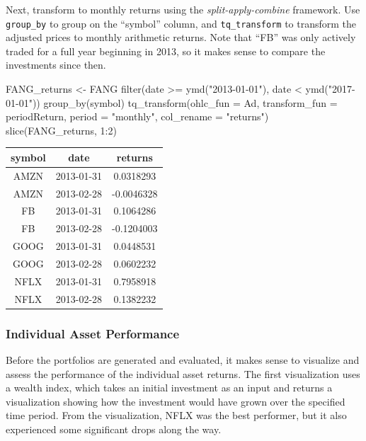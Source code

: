 \hspace{20 mm}

Next, transform to monthly returns using the \emph{split-apply-combine}
framework. Use \texttt{group\_by} to group on the ``symbol'' column, and
\texttt{tq\_transform} to transform the adjusted prices to monthly
arithmetic returns. Note that ``FB'' was only actively traded for a full
year beginning in 2013, so it makes sense to compare the investments
since then.

\begin{Schunk}
\begin{Sinput}
FANG_returns <- FANG %
    filter(date >= ymd("2013-01-01"),
           date <  ymd("2017-01-01")) %
    group_by(symbol) %
    tq_transform(ohlc_fun = Ad,
                 transform_fun = periodReturn,
                 period = "monthly",
                 col_rename = "returns")
slice(FANG_returns, 1:2)
\end{Sinput}
\end{Schunk}

\begin{tabular}{ccc}
\toprule
symbol & date & returns\\
\midrule
AMZN & 2013-01-31 & 0.0318293\\
AMZN & 2013-02-28 & -0.0046328\\
FB & 2013-01-31 & 0.1064286\\
FB & 2013-02-28 & -0.1204003\\
GOOG & 2013-01-31 & 0.0448531\\
\addlinespace
GOOG & 2013-02-28 & 0.0602232\\
NFLX & 2013-01-31 & 0.7958918\\
NFLX & 2013-02-28 & 0.1382232\\
\bottomrule
\end{tabular}

\hspace{20 mm}

\subsubsection{Individual Asset
Performance}\label{individual-asset-performance}

Before the portfolios are generated and evaluated, it makes sense to
visualize and assess the performance of the individual asset returns.
The first visualization uses a wealth index, which takes an initial
investment as an input and returns a visualization showing how the
investment would have grown over the specified time period. From the
visualization, NFLX was the best performer, but it also experienced some
significant drops along the way.


